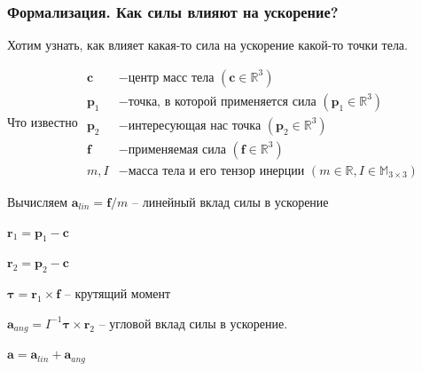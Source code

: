 \documentclass{beamer}
\begin{document}
\begin{frame}
\small
\frametitle{Формализация. Как силы влияют на ускорение?}
    
    Хотим узнать, как влияет какая-то сила на ускорение какой-то точки тела.

    \begin{block}{Что известно}
        $
        \begin{aligned}
            \pmb{c} &- \text{центр масс тела } (\pmb{c} \in \mathbb{R}^3) \\
            \pmb{p}_1 &- \text{точка, в которой применяется сила } (\pmb{p}_1 \in \mathbb{R}^3) \\
            \pmb{p}_2 &- \text{интересующая нас точка } (\pmb{p}_2 \in \mathbb{R}^3) \\
            \pmb{f} &- \text{применяемая сила } (\pmb{f} \in \mathbb{R}^3) \\
            m, I &- \text{масса тела и его тензор инерции } (m \in \mathbb{R}, I \in \mathbb{M}_{3 \times 3})
        \end{aligned}
        $
    \end{block}

    \begin{block}{Вычисляем}
        $\pmb{a}_{lin} = \pmb{f}/m$ -- линейный вклад силы в ускорение
        
        $\pmb{r}_1 = \pmb{p}_1 - \pmb{c}$
        
        $\pmb{r}_2 = \pmb{p}_2 - \pmb{c}$

        $\pmb{\tau} = \pmb{r}_1 \times \pmb{f}$ -- крутящий момент

        $\pmb{a}_{ang} = I^{-1} \pmb{\tau} \times \pmb{r}_2$ -- угловой вклад силы в ускорение.

        $\pmb{a} = \pmb{a}_{lin} + \pmb{a}_{ang}$
    \end{block}
\end{frame}

\newcommand*{\defeq}{\stackrel{\scalebox{0.5}{\text{def}}}{:=}}
\end{document}
